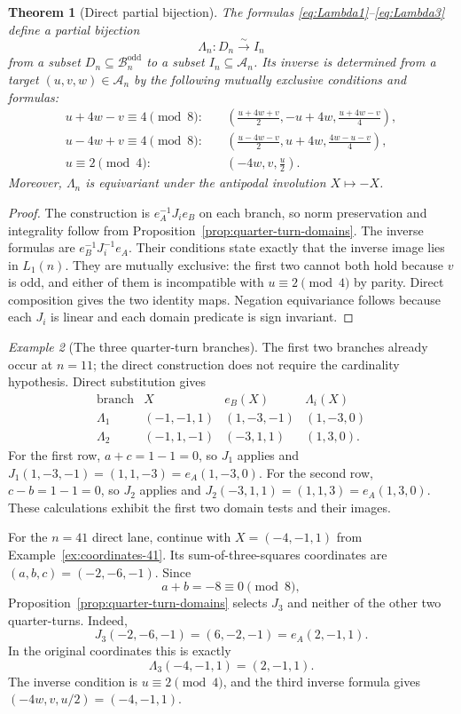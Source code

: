 \documentclass[11pt]{amsart}
\newtheorem{theorem}{Theorem}[section]
\theoremstyle{definition}
\theoremstyle{remark}
\newtheorem{example}[theorem]{Example}
\newcommand{\An}{\mathcal A_n}
\newcommand{\Bodd}{\mathcal B_n^{\mathrm{odd}}}
\begin{document}
\begin{theorem}[Direct partial bijection]\label{thm:direct-layer}
The formulas \eqref{eq:Lambda1}--\eqref{eq:Lambda3} define a partial
bijection
\[
 \Lambda_n:D_n\xrightarrow{\sim}I_n
\]
from a subset $D_n\subseteq\Bodd$ to a subset $I_n\subseteq\An$.  Its inverse
is determined from a target $(u,v,w)\in\An$ by the following mutually
exclusive conditions and formulas:
\begin{align*}
 u+4w-v\equiv4\pmod8:
 &\quad
 \left(\frac{u+4w+v}{2},-u+4w,\frac{u+4w-v}{4}\right),\\
 u-4w+v\equiv4\pmod8:
 &\quad
 \left(\frac{u-4w-v}{2},u+4w,\frac{4w-u-v}{4}\right),\\
 u\equiv2\pmod4:
 &\quad
 \left(-4w,v,\frac{u}{2}\right).
\end{align*}
Moreover, $\Lambda_n$ is equivariant under the antipodal involution
$X\mapsto-X$.
\end{theorem}

\begin{proof}
The construction is $e_A^{-1}J_i e_B$ on each branch, so norm preservation and
integrality follow from Proposition~\ref{prop:quarter-turn-domains}.  The
inverse formulas are $e_B^{-1}J_i^{-1}e_A$.  Their conditions state exactly
that the inverse image lies in $L_1(n)$.  They are mutually exclusive: the first
two cannot both hold because $v$ is odd, and either of them is incompatible
with $u\equiv2\pmod4$ by parity.  Direct composition gives the two identity
maps.  Negation equivariance follows because each $J_i$ is linear and each
domain predicate is sign invariant.
\end{proof}

\begin{example}[The three quarter-turn branches]
\label{ex:quarter-turn-41}
The first two branches already occur at $n=11$; the direct construction does
not require the cardinality hypothesis.  Direct substitution gives
\[
\begin{array}{c|c|c|c}
\text{branch}&X&e_B(X)&\Lambda_i(X)\\ \hline
\Lambda_1&(-1,-1,1)&(1,-3,-1)&(1,-3,0)\\
\Lambda_2&(-1,1,-1)&(-3,1,1)&(1,3,0).
\end{array}
\]
For the first row, $a+c=1-1=0$, so $J_1$ applies and
$J_1(1,-3,-1)=(1,1,-3)=e_A(1,-3,0)$.  For the second row,
$c-b=1-1=0$, so $J_2$ applies and
$J_2(-3,1,1)=(1,1,3)=e_A(1,3,0)$.  These calculations exhibit the first two
domain tests and their images.

For the $n=41$ direct lane, continue with $X=(-4,-1,1)$ from
Example~\ref{ex:coordinates-41}.  Its
sum-of-three-squares coordinates are $(a,b,c)=(-2,-6,-1)$.  Since
\[
 a+b=-8\equiv0\pmod8,
\]
Proposition~\ref{prop:quarter-turn-domains} selects $J_3$ and neither of the
other two quarter-turns.  Indeed,
\[
 J_3(-2,-6,-1)=(6,-2,-1)=e_A(2,-1,1).
\]
In the original coordinates this is exactly
\[
 \Lambda_3(-4,-1,1)=(2,-1,1).
\]
The inverse condition is $u\equiv2\pmod4$, and the third inverse formula gives
$(-4w,v,u/2)=(-4,-1,1)$.
\end{example}
\end{document}
